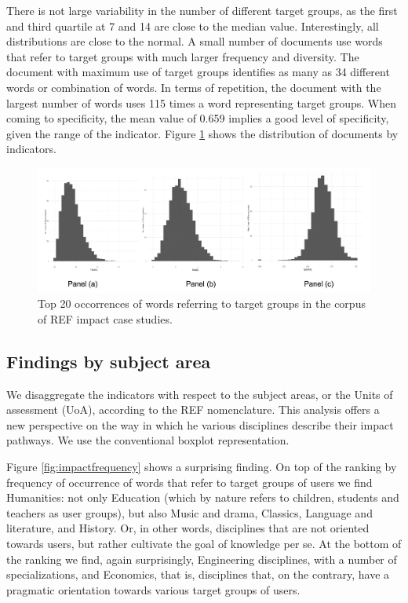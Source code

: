 \documentclass[b5paper,]{book}
\theoremstyle{definition}
\theoremstyle{definition}
\theoremstyle{definition}
\theoremstyle{remark}
\begin{document}
There is not large variability in the number of different target groups,
as the first and third quartile at 7 and 14 are close to the median
value. Interestingly, all distributions are close to the normal. A small
number of documents use words that refer to target groups with much
larger frequency and diversity. The document with maximum use of target
groups identifies as many as 34 different words or combination of words.
In terms of repetition, the document with the largest number of words
uses 115 times a word representing target groups. When coming to
specificity, the mean value of 0.659 implies a good level of
specificity, given the range of the indicator. Figure
\ref{fig:impactusersfreqcomparison} shows the distribution of documents
by indicators.

\begin{figure}

{\centering \includegraphics[width=1\linewidth]{_bookdown_files/figures/impact_users_freq_comparison} 

}

\caption{Top 20 occorrences of words referring to target groups in the corpus of REF impact case studies.}\label{fig:impactusersfreqcomparison}
\end{figure}

\subsection{Findings by subject area}\label{findings-by-subject-area}

We disaggregate the indicators with respect to the subject areas, or the
Units of assessment (UoA), according to the REF nomenclature. This
analysis offers a new perspective on the way in which he various
disciplines describe their impact pathways. We use the conventional
boxplot representation.

Figure \ref{fig:impactfrequency} shows a surprising finding. On top of
the ranking by frequency of occurrence of words that refer to target
groups of users we find Humanities: not only Education (which by nature
refers to children, students and teachers as user groups), but also
Music and drama, Classics, Language and literature, and History. Or, in
other words, disciplines that are not oriented towards users, but rather
cultivate the goal of knowledge per se. At the bottom of the ranking we
find, again surprisingly, Engineering disciplines, with a number of
specializations, and Economics, that is, disciplines that, on the
contrary, have a pragmatic orientation towards various target groups of
users.
\end{document}
